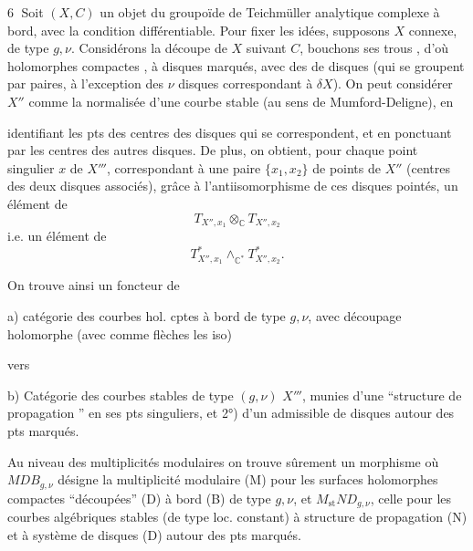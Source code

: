 \textcircled{6}
Soit $(X,C)$ un objet du groupoïde
de Teichmüller analytique complexe
à bord, avec la condition différentiable.
Pour fixer les idées, supposons $X$ connexe,
de type $g,\nu$. Considérons la découpe 
de $X$ suivant $C$, bouchons ses trous
,
d'où  holomorphes compactes , à disques
 marqués, avec des  de  disques
(qui se groupent  par paires, à l'exception
des $\nu$ disques correspondant à $\delta X$).
On peut considérer $X''$ comme la
normalisée d'une courbe  stable
(au sens de Mumford-Deligne), en

identifiant les pts des centres des disques
qui se correspondent, et en ponctuant
par les centres des autres disques.
De plus, on obtient,  pour chaque
point singulier $x$ de $X'''$, correspondant
à une paire $\{x_1,x_2\}$ de points de
$X''$ (centres des deux disques associés),
grâce à l'antiisomorphisme de ces
disques pointés, un élément 
de
\[
T_{X'',x_1}\otimes_{\mathbb C}T_{X'',x_2}
\]
i.e. un élément de
\[
T^*_{X'',x_1}\wedge_{\mathbb C^*}T^*_{X'',x_2}.
\]

On trouve ainsi un foncteur de

a) catégorie  des courbes hol. cptes à bord  de
type $g,\nu$, avec découpage holomorphe
(avec comme flèches les iso)

vers

b) Catégorie des courbes  stables de type $(g,\nu)$
$X'''$, munies  d'une ``structure de propagation
'' en ses pts singuliers, et 2°) d'un
 admissible de
disques autour des pts marqués.

Au niveau des multiplicités modulaires 
on trouve sûrement un morphisme 
où $MDB_{g,\nu}$ désigne la multiplicité modulaire
(M) pour les surfaces holomorphes compactes
``découpées'' (D) à bord (B) de type $g,\nu$, et
$M_{\mathrm{st}}ND_{g,\nu}$, celle pour les courbes algébriques
stables (de type loc. constant)  à structure de
propagation  (N) et à système  de
disques (D) autour des pts marqués.

